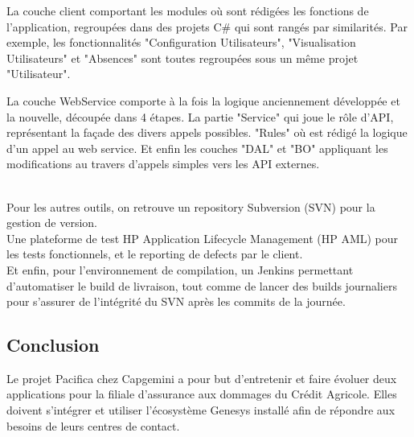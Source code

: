\documentclass{rapport}
\begin{document}
\begin{minipage}{0.35\textwidth}
\end{minipage}
\begin{minipage}{0.55\textwidth}
La couche client comportant les modules où sont rédigées les fonctions de l'application, regroupées dans des projets C\# qui sont rangés par similarités. Par exemple, les fonctionnalités "Configuration Utilisateurs", "Visualisation Utilisateurs" et "Absences" sont toutes regroupées sous un même projet "Utilisateur".
\end{minipage}
\vspace{5mm} %

\begin{minipage}{0.35\textwidth}
\end{minipage}
\begin{minipage}{0.55\textwidth}
La couche WebService comporte à la fois la logique anciennement développée et la nouvelle, découpée dans 4 étapes. La partie "Service" qui joue le rôle d'API, représentant la façade des divers appels possibles. "Rules" où est rédigé la logique d'un appel au web service. Et enfin les couches "DAL" et "BO" appliquant les modifications au travers d'appels simples vers les API externes.
\end{minipage}
\vspace{5mm} %
\\

Pour les autres outils, on retrouve un repository Subversion (SVN) pour la gestion de version.\\
Une plateforme de test HP Application Lifecycle Management (HP AML) pour les tests fonctionnels, et le reporting de defects par le client.\\
Et enfin, pour l'environnement de compilation, un Jenkins permettant d'automatiser le build de livraison, tout comme de lancer des builds journaliers pour s'assurer de l'intégrité du SVN après les commits de la journée.

\subsection{Conclusion}

Le projet Pacifica chez Capgemini a pour but d'entretenir et faire évoluer deux applications pour la filiale d'assurance aux dommages du Crédit Agricole. Elles doivent s'intégrer et utiliser l'écosystème Genesys installé  afin de répondre aux besoins de leurs centres de contact.\\
\end{document}
